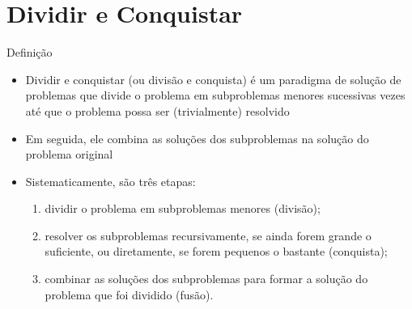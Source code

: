 \section{Dividir e Conquistar}

\begin{frame}[fragile]{Definição}

    \begin{itemize}
        \item Dividir e conquistar (ou divisão e conquista) é um paradigma de solução de problemas
            que divide o problema em subproblemas menores sucessivas vezes até que o problema
            possa ser (trivialmente) resolvido

        \item Em seguida, ele combina as soluções dos subproblemas na solução do problema original

        \item Sistematicamente, são três etapas:

        \begin{enumerate}
            \item dividir o problema em subproblemas menores (divisão);

            \item resolver os subproblemas recursivamente, se ainda forem grande o suficiente,
                ou diretamente, se forem pequenos o bastante (conquista);

            \item combinar as soluções dos subproblemas para formar a solução do problema
                que foi dividido (fusão).
        \end{enumerate}

    \end{itemize}

\end{frame}

